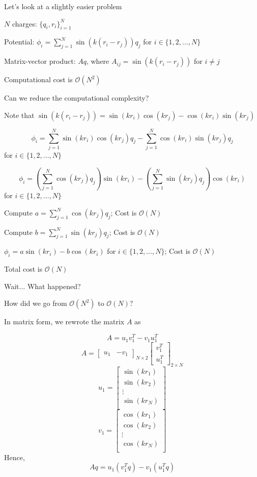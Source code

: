 \documentclass{article}
\newcommand{\bkt}[1]{\left(#1\right)}
\newcommand{\dsum}{\displaystyle\sum}
\newcommand{\cntr}[1]{\begin{center}#1\end{center}\vspace{1em}}
\begin{document}
	\newpage
	\LARGE
	\cntr{Let's look at a slightly easier problem}
	\cntr{$N$ charges: $\{q_i,r_i\}_{i=1}^N$}
	\cntr{Potential: $\phi_i = \dsum_{j=1}^N \sin\bkt{k \bkt{r_i - r_j}} q_j$ for $i \in \{1,2,\ldots,N\}$}
	\cntr{Matrix-vector product: $Aq$, where $A_{ij} =\sin\bkt{k \bkt{r_i - r_j}}$ for $i \neq j$}
	\cntr{Computational cost is $\mathcal{O}(N^2)$}
	\cntr{Can we reduce the computational complexity?}
	\newpage
	\cntr{Note that $\sin\bkt{k \bkt{r_i - r_j}} = \sin\bkt{k r_i} \cos\bkt{k r_j} - \cos\bkt{k r_i} \sin\bkt{k r_j}$}
	\cntr{$$\phi_i = \dsum_{j=1}^N \sin\bkt{k r_i} \cos\bkt{k r_j} q_j - \dsum_{j=1}^N \cos\bkt{k r_i} \sin\bkt{k r_j} q_j$$
	for $i \in \{1,2,\ldots,N\}$}
	\cntr{$$\phi_i = \bkt{\dsum_{j=1}^N\cos\bkt{k r_j} q_j}\sin\bkt{k r_i}  - \bkt{\dsum_{j=1}^N \sin\bkt{k r_j} q_j}\cos\bkt{k r_i} $$
	for $i \in \{1,2,\ldots,N\}$}
	\cntr{Compute $a = \dsum_{j=1}^N\cos\bkt{k r_j} q_j$; Cost is $\mathcal{O}(N)$}
	\cntr{Compute $b = \dsum_{j=1}^N\sin\bkt{k r_j} q_j$; Cost is $\mathcal{O}(N)$}
	\cntr{$\phi_i = a \sin\bkt{kr_i} - b \cos\bkt{kr_i}$ for $i \in \{1,2,\ldots,N\}$; Cost is $\mathcal{O}(N)$}
	\cntr{Total cost is $\mathcal{O}(N)$}
	\cntr{Wait... What happened?}
	\cntr{How did we go from $\mathcal{O}(N^2)$ to $\mathcal{O}(N)$?}
	\cntr{In matrix form, we rewrote the matrix $A$ as}
	$$A = u_1 v_1^T - v_1 u_1^T$$
	$$A = \begin{bmatrix}
	u_1 & -v_1
	\end{bmatrix}_{N \times 2}
	\begin{bmatrix}
		v_1^T\\
		u_1^T
	\end{bmatrix}_{2 \times N}
	$$
	$$u_1 = \begin{bmatrix}
	\sin\bkt{kr_1}\\
	\sin\bkt{kr_2}\\
	\vdots\\
	\sin\bkt{kr_N}\\
	\end{bmatrix}$$
	$$v_1 = \begin{bmatrix}
	\cos\bkt{kr_1}\\
	\cos\bkt{kr_2}\\
	\vdots\\
	\cos\bkt{kr_N}\\
	\end{bmatrix}$$
	Hence,
	$$Aq = u_1 \bkt{v_1^Tq} - v_1 \bkt{u_1^Tq}$$
	
	\newpage
	

	
\end{document}
